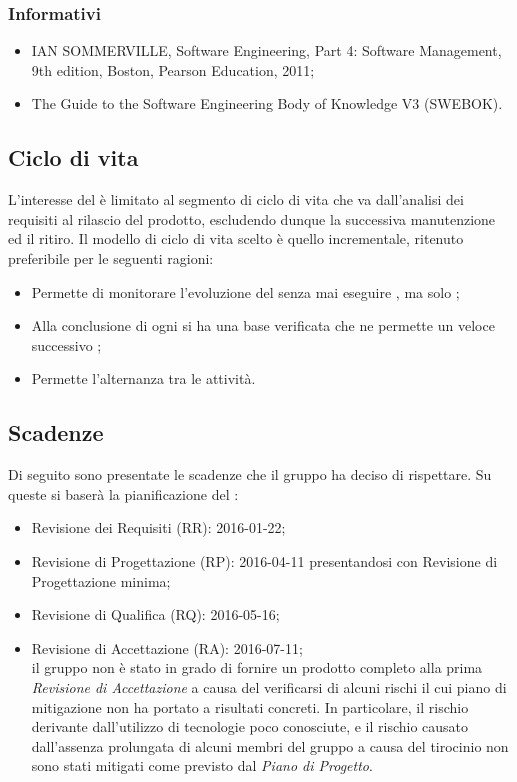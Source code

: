 \subsubsection{Informativi}
\begin{itemize}
\item IAN SOMMERVILLE, Software Engineering, Part 4: Software Management, 9th edition, Boston, Pearson Education, 2011;
\item The Guide to the Software Engineering Body of Knowledge V3 (SWEBOK).
\end{itemize}

\subsection{Ciclo di vita}
L’interesse del  è limitato al segmento di ciclo di vita che va dall’analisi dei requisiti al
rilascio del prodotto, escludendo dunque la successiva manutenzione ed il ritiro. Il modello di ciclo di
vita scelto \`e quello incrementale, ritenuto preferibile per le seguenti ragioni:
\begin{itemize}
\item Permette di monitorare l'evoluzione del  senza mai eseguire , ma solo ;
\item Alla conclusione di ogni  si ha una base verificata che ne permette un veloce successivo ;
\item Permette l'alternanza tra le attivit\`a.
\end{itemize}

\subsection{Scadenze}
Di seguito sono presentate le scadenze che il gruppo ha deciso di rispettare. Su queste si baserà la pianificazione del :
\begin{itemize}
\item Revisione dei Requisiti (RR): 2016-01-22;
\item Revisione di Progettazione (RP): 2016-04-11 presentandosi con Revisione di Progettazione minima; 
\item Revisione di Qualifica (RQ): 2016-05-16;
\item Revisione di Accettazione (RA): 2016-07-11; \\il gruppo non è stato in grado di fornire un prodotto completo
alla prima \textit{Revisione di Accettazione} a causa del verificarsi di alcuni rischi il cui piano di mitigazione
non ha portato a risultati concreti.
In particolare, il rischio derivante dall'utilizzo di tecnologie poco conosciute, e il rischio causato dall'assenza
prolungata di alcuni membri del gruppo a causa del tirocinio non sono stati mitigati come previsto dal \textit{Piano di Progetto}.
\end{itemize}

